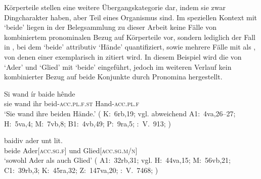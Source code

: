 

Körperteile stellen eine weitere Übergangskategorie dar, indem sie zwar
Ding\-charakter haben, aber Teil eines Organismus sind. Im
speziellen Kontext mit  `beide' liegen in der Belegsammlung zu
dieser Arbeit keine Fälle von kombiniertem pronominalen Bezug auf Körperteile
vor, sondern lediglich der Fall in , bei dem 
`beide' attributiv  `Hände' quantifiziert, sowie
mehrere Fälle mit  als , von denen einer
exemplarisch in  zitiert wird. In diesem Beispiel wird
die  von  `Ader' und  `Glied' mit
 `beide' eingeführt, jedoch im weiteren Verlauf kein kombinierter
Bezug auf beide Konjunkte durch Pronomina hergestellt.

\begin{exe}
\ex \begin{xlist}
	\ex \label{ex:bodyparts_attr}
		\gll Si wand ír baide hênde \\
			sie wand ihr beid-\textsc{acc.pl.f.st} Hand-\textsc{acc.pl.f} \\
		\trans `Sie wand ihre beiden Hände.'
			(%
				K:~6rb,19; vgl. abweichend
				A1:~4va,26--27;
				H:~5va,4;
				M:~7vb,8;
				B1:~4vb,49;
				P:~9ra,5;
				\KC:~V.~913; \cite[98]{schroeder1895}%
			)

	\ex \label{ex:bodyparts_conj}
		\gll baidiv ader unt lit. \\
			beide Ader[\textsc{acc.sg.f}] und Glied[\textsc{acc.sg.m/n}] \\
		\trans `sowohl Ader als auch Glied'
			(%
				A1:~32rb,31; vgl.
				H:~44va,15;
				M:~56vb,21;
				C1:~39rb,3;
				K:~45ra,32;
				Z:~147va,20;
				\KC:~V.~7468; \cite[218]{schroeder1895}%
			)
\end{xlist}
\end{exe}

